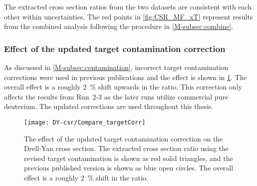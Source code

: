\documentclass[../main.tex]{subfiles}
\begin{document}
The extracted cross section ratios from the two datasets are consistent with each other within uncertainties.
The red points in \cref{fig:CSR_MF_xT} represent results from the combined analysis following the procedure in \cref{M-subsec:combine}.
\FloatBarrier

\subsubsection{Effect of the updated target contamination correction}
\label{subsubsec:contamination_result}
As discussed in \cref{M-subsec:contamination}, incorrect target contamination corrections were used
in previous publications and the effect is shown in \cref{fig:contaimination_CSR}.
The overall effect is a roughly \SI{2}{\percent} shift upwards in the ratio.
This correction only affects the results from Run~2-3 as the later runs utilize commercial pure deuterium.
The updated corrections are used throughout this thesis.
\begin{figure}[htpb!]
	\centering
	\texttt{[image: DY-csr/Compare\_targetCorr]}
	\caption{The effect of the updated target contamination correction on the Drell-Yan
		cross section. The extracted cross section ratio using the revised target contamination
		is shown as red solid triangles, and the previous published version is shown as blue open
		circles. The overall effect is a roughly \SI{2}{\percent} shift in the ratio. }
	\label{fig:contaimination_CSR}
\end{figure}
\FloatBarrier
\end{document}
